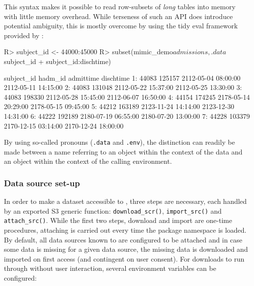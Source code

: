 \documentclass[
]{jss}
\begin{document}
This syntax makes it possible to read row-subsets of \emph{long} tables
into memory with little memory overhead. While terseness of such an API
does introduce potential ambiguity, this is mostly overcome by using the
tidy eval framework provided by  \citep{wickham2020}:

\begin{CodeChunk}
\begin{CodeInput}
R> subject_id <- 44000:45000
R> subset(mimic_demo$admissions, .data$subject_id %
+        subject_id:dischtime)
\end{CodeInput}
\begin{CodeOutput}
   subject_id hadm_id           admittime           dischtime
1:      44083  125157 2112-05-04 08:00:00 2112-05-11 14:15:00
2:      44083  131048 2112-05-22 15:37:00 2112-05-25 13:30:00
3:      44083  198330 2112-05-28 15:45:00 2112-06-07 16:50:00
4:      44154  174245 2178-05-14 20:29:00 2178-05-15 09:45:00
5:      44212  163189 2123-11-24 14:14:00 2123-12-30 14:31:00
6:      44222  192189 2180-07-19 06:55:00 2180-07-20 13:00:00
7:      44228  103379 2170-12-15 03:14:00 2170-12-24 18:00:00
\end{CodeOutput}
\end{CodeChunk}

By using so-called pronouns (\texttt{.data} and \texttt{.env}), the
distinction can readily be made between a name referring to an object
within the context of the data and an object within the context of the
calling environment.

\hypertarget{data-source-set-up}{%
\subsubsection{Data source set-up}\label{data-source-set-up}}

In order to make a dataset accessible to , three steps are
necessary, each handled by an exported S3 generic function:
\texttt{download\_scr()}, \texttt{import\_src()} and
\texttt{attach\_src()}. While the first two steps, download and import
are one-time procedures, attaching is carried out every time the package
namespace is loaded. By default, all data sources known to 
are configured to be attached and in case some data is missing for a
given data source, the missing data is downloaded and imported on first
access (and contingent on user consent). For downloads to run through
without user interaction, several environment variables can be
configured:
\end{document}
